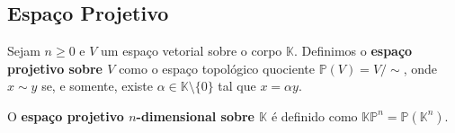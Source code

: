 \subsection{Espaço Projetivo}
\label{espaco-projetivo-def}
\begin{defi}
     Sejam $n\geq 0$ e $V$ um espaço vetorial sobre o corpo $\mathbb{K}$. Definimos o \textbf{espaço projetivo sobre $V$} como o espaço topológico quociente $\mathbb{P}(V) = V/\sim$, onde $x\sim y$ se, e somente, existe $\alpha \in \mathbb{K} \setminus\{0\}$ tal que $x = \alpha y$.

     O \textbf{espaço projetivo $n$-dimensional sobre $\mathbb{K}$} é definido como $\mathbb{KP}^n = \mathbb{P}(\mathbb{K}^n)$.
\end{defi}
